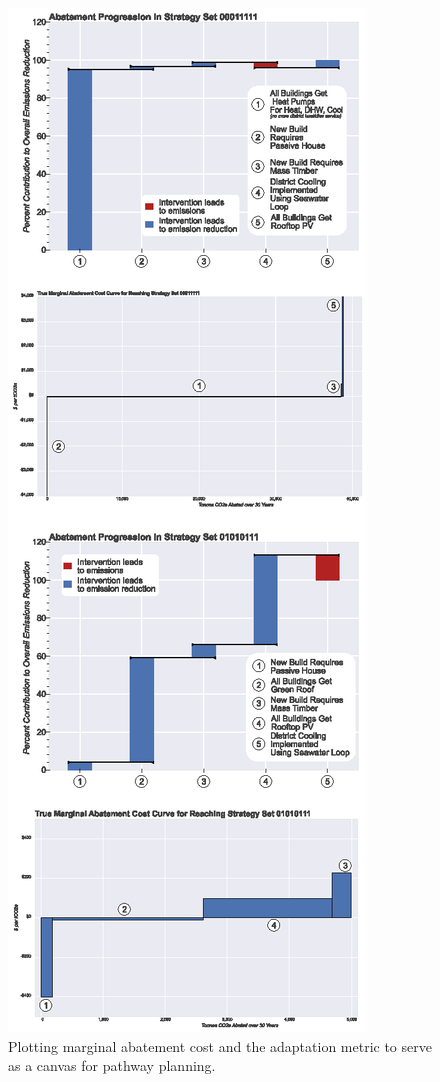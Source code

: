 \documentclass[twocolumn, a4paper,10pt]{article}
\begin{document}
\begin{figure}[hbpt]
    \centering
    \includegraphics[scale=0.8]{figures/true_maccs_waterfalls_both.eps}
    \caption{Plotting marginal abatement cost and the adaptation metric to serve as a canvas for pathway planning.}
    \label{fig:true_macc_both}
\end{figure}
\end{document}
